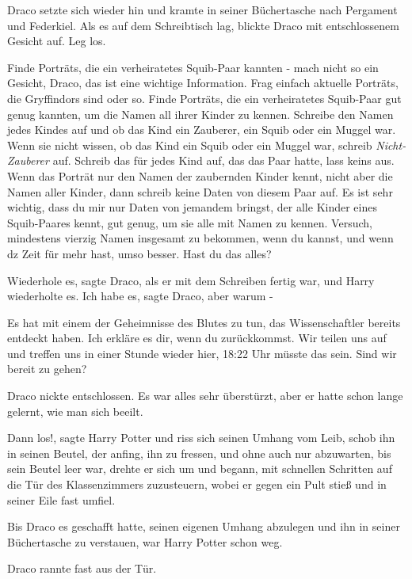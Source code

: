 Draco setzte sich wieder hin und kramte in seiner Büchertasche nach Pergament
und Federkiel. Als es auf dem Schreibtisch lag, blickte Draco mit entschlossenem
Gesicht auf. \glqq{}Leg los.\grqq{}

\glqq{}Finde Porträts, die ein verheiratetes Squib-Paar kannten - mach nicht so
ein Gesicht, Draco, das ist eine wichtige Information. Frag einfach aktuelle
Porträts, die Gryffindors sind oder so. Finde Porträts, die ein verheiratetes
Squib-Paar gut genug kannten, um die Namen all ihrer Kinder zu kennen. Schreibe
den Namen jedes Kindes auf und ob das Kind ein Zauberer, ein Squib oder ein
Muggel war. Wenn sie nicht wissen, ob das Kind ein Squib oder ein Muggel war,
schreib \emph{\glqq{}Nicht-Zauberer\grqq{}} auf. Schreib das für jedes Kind auf,
das das Paar hatte, lass keins aus. Wenn das Porträt nur den Namen der
zaubernden Kinder kennt, nicht aber die Namen aller Kinder, dann schreib keine
Daten von diesem Paar auf. Es ist sehr wichtig, dass du mir nur Daten von
jemandem bringst, der alle Kinder eines Squib-Paares kennt, gut genug, um sie
alle mit Namen zu kennen. Versuch, mindestens vierzig Namen insgesamt zu
bekommen, wenn du kannst, und wenn dz Zeit für mehr hast, umso besser. Hast du
das alles?\grqq{}

\glqq{}Wiederhole es\grqq{}, sagte Draco, als er mit dem Schreiben fertig war,
und Harry wiederholte es. \glqq{}Ich habe es\grqq{}, sagte Draco, \glqq{}aber
warum -\grqq{}

\glqq{}Es hat mit einem der Geheimnisse des Blutes zu tun, das Wissenschaftler
bereits entdeckt haben. Ich erkläre es dir, wenn du zurückkommst. Wir teilen uns
auf und treffen uns in einer Stunde wieder hier, 18:22 Uhr müsste das sein. Sind
wir bereit zu gehen?\grqq{}

Draco nickte entschlossen. Es war alles sehr überstürzt, aber er hatte schon
lange gelernt, wie man sich beeilt.

\glqq{}Dann los!\grqq{}, sagte Harry Potter und riss sich seinen Umhang vom Leib,
schob ihn in seinen Beutel, der anfing, ihn zu fressen, und ohne auch nur
abzuwarten, bis sein Beutel leer war, drehte er sich um und begann, mit
schnellen Schritten auf die Tür des Klassenzimmers zuzusteuern, wobei er gegen
ein Pult stieß und in seiner Eile fast umfiel.

Bis Draco es geschafft hatte, seinen eigenen Umhang abzulegen und ihn in seiner
Büchertasche zu verstauen, war Harry Potter schon weg.

Draco rannte fast aus der Tür.
